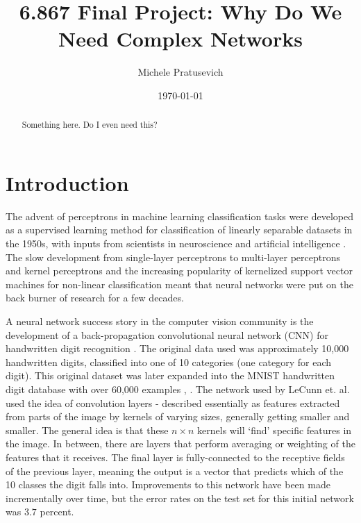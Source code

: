 \documentclass[10pt]{article}
\begin{document}
\title{6.867 Final Project: Why Do We Need Complex Networks}
\author{Michele Pratusevich}
\date{\today}
\maketitle

\begin{abstract}
Something here. Do I even need this?
\end{abstract}

\section{Introduction}

The advent of perceptrons in machine learning classification tasks were developed as a supervised learning method for classification of linearly separable datasets in the 1950s, with inputs from scientists in neuroscience and artificial intelligence \cite{rosenblatt_perceptron:_1958}. The slow development from single-layer perceptrons to multi-layer perceptrons and kernel perceptrons \cite{aizerman_theoretical_1964} and the increasing popularity of kernelized support vector machines for non-linear classification meant that neural networks were put on the back burner of research for a few decades.

A neural network success story in the computer vision community is the development of a back-propagation convolutional neural network (CNN) for handwritten digit recognition \cite{lecun_handwritten_1990}. The original data used was approximately 10,000 handwritten digits, classified into one of 10 categories (one category for each digit). This original dataset was later expanded into the MNIST handwritten digit database with over 60,000 examples \cite{lecun_gradient-based_1998}, \cite{li_deng_mnist_2012}. The network used by LeCunn et. al. used the idea of convolution layers - described essentially as features extracted from parts of the image by kernels of varying sizes, generally getting smaller and smaller. The general idea is that these $n \times n$ kernels will `find' specific features in the image. In between, there are layers that perform averaging or weighting of the features that it receives. The final layer is fully-connected to the receptive fields of the previous layer, meaning the output is a vector that predicts which of the 10 classes the digit falls into. Improvements to this network have been made incrementally over time, but the error rates on the test set for this initial network was $3.7$ percent. 
\end{document}
